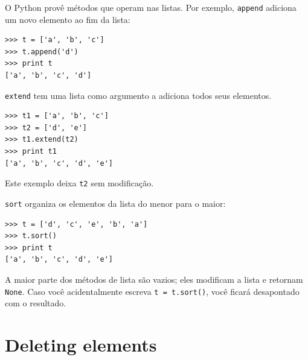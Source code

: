 
O Python provê métodos que operam nas listas. Por exemplo,
{\tt append} adiciona um novo elemento ao fim da lista:


\beforeverb
\begin{verbatim}
>>> t = ['a', 'b', 'c']
>>> t.append('d')
>>> print t
['a', 'b', 'c', 'd']
\end{verbatim}
\afterverb
%

{\tt extend} tem uma lista como argumento a adiciona todos seus elementos.


\beforeverb
\begin{verbatim}
>>> t1 = ['a', 'b', 'c']
>>> t2 = ['d', 'e']
>>> t1.extend(t2)
>>> print t1
['a', 'b', 'c', 'd', 'e']
\end{verbatim}
\afterverb
%
Este exemplo deixa {\tt t2} sem modificação.

{\tt sort} organiza os elementos da lista do menor para o maior:


\beforeverb
\begin{verbatim}
>>> t = ['d', 'c', 'e', 'b', 'a']
>>> t.sort()
>>> print t
['a', 'b', 'c', 'd', 'e']
\end{verbatim}
\afterverb
%
A maior parte dos métodos de lista são vazios; eles modificam a lista e retornam {\tt None}.
Caso você acidentalmente escreva {\tt t = t.sort()}, você ficará desapontado com o resultado.


\section{Deleting elements}



